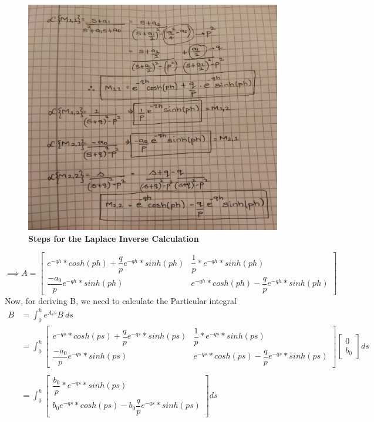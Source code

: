 \documentclass[a4paper,12pt]{article}
\begin{document}
\begin{figure}[H]
\centering
\includegraphics[scale=0.4]{image_1.jpeg}
\caption{\textbf{Steps for the Laplace Inverse Calculation}}
\label{A_cal}
\end{figure}
\begin{equation}
\implies
\boxed{
A = \begin{bmatrix}
e^{-qh}*cosh(ph) + \dfrac{q}{p}e^{-qh}*sinh(ph) & \dfrac{1}{p}*e^{-qh}*sinh(ph) \\
\dfrac{-a_0}{p}e^{-qh}*sinh(ph) & e^{-qh}*cosh(ph) - \dfrac{q}{p}e^{-qh}*sinh(ph)
\end{bmatrix}}
\end{equation}
Now, for deriving B, we need to calculate the Particular integral 
\begin{align*}
	B &= \int_{0}^{h} e^{A_c s} B \ ds \\
	&= \int_{0}^{h} \begin{bmatrix}
	e^{-qs}*cosh(ps) + \dfrac{q}{p}e^{-qs}*sinh(ps) & \dfrac{1}{p}*e^{-qs}*sinh(ps) \\
\dfrac{-a_0}{p}e^{-qs}*sinh(ps) & e^{-qs}*cosh(ps) - \dfrac{q}{p}e^{-qs}*sinh(ps)
	\end{bmatrix} \begin{bmatrix}
	0 \\
	b_0
	\end{bmatrix} ds \\ \\
	&= \int_{0}^{h} \begin{bmatrix}
	\dfrac{b_0}{p}*e^{-qs}*sinh(ps) \\
	b_0e^{-qs}*cosh(ps) - b_0\dfrac{q}{p}e^{-qs}*sinh(ps)
	\end{bmatrix} ds
\end{align*}
\end{document}
